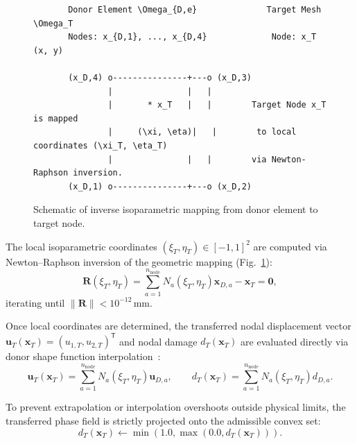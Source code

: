 \begin{figure}[htbp]
\centering
\small
\begin{verbatim}
       Donor Element \Omega_{D,e}              Target Mesh \Omega_T
       Nodes: x_{D,1}, ..., x_{D,4}             Node: x_T (x, y)
       
       (x_D,4) o---------------+---o (x_D,3)
               |               |   |
               |       * x_T   |   |        Target Node x_T is mapped
               |     (\xi, \eta)|   |        to local coordinates (\xi_T, \eta_T)
               |               |   |        via Newton-Raphson inversion.
       (x_D,1) o---------------+---o (x_D,2)
\end{verbatim}
\caption[Schematic of inverse isoparametric mapping from donor element to target node.]{Schematic of inverse isoparametric mapping from donor element to target node.}
\label{fig:inverse_isoparametric_mapping}
\end{figure}

The local isoparametric coordinates $(\xi_T, \eta_T) \in [-1, 1]^2$ are computed via Newton--Raphson inversion of the geometric mapping (Fig.~\ref{fig:inverse_isoparametric_mapping}):
\begin{equation}
\label{eq:geometric_inversion}
\mathbf{R}(\xi_T, \eta_T) = \sum_{a=1}^{n_{\mathrm{node}}} N_a(\xi_T, \eta_T) \mathbf{x}_{D,a} - \mathbf{x}_T = \mathbf{0},
\end{equation}
iterating until $\|\mathbf{R}\| < 10^{-12}\,\text{mm}$.

Once local coordinates are determined, the transferred nodal displacement vector $\mathbf{u}_T(\mathbf{x}_T) = (u_{1,T}, u_{2,T})^{\mathsf{T}}$ and nodal damage $d_T(\mathbf{x}_T)$ are evaluated directly via donor shape function interpolation~\cite{farhat1998,cebral1997}:
\begin{equation}
\label{eq:nodal_transfer_eval}
\mathbf{u}_T(\mathbf{x}_T) = \sum_{a=1}^{n_{\mathrm{node}}} N_a(\xi_T, \eta_T) \mathbf{u}_{D,a}, \qquad d_T(\mathbf{x}_T) = \sum_{a=1}^{n_{\mathrm{node}}} N_a(\xi_T, \eta_T) d_{D,a}.
\end{equation}

To prevent extrapolation or interpolation overshoots outside physical limits, the transferred phase field is strictly projected onto the admissible convex set:
\begin{equation}
\label{eq:phase_field_hard_clamp}
d_T(\mathbf{x}_T) \leftarrow \min\left( 1.0, \max(0.0, d_T(\mathbf{x}_T)) \right).
\end{equation}

